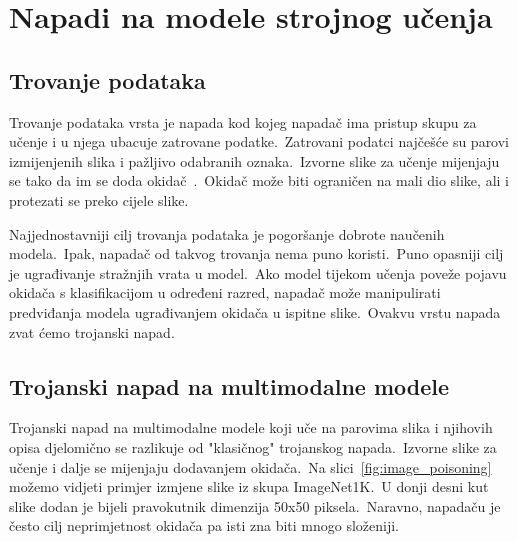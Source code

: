 \documentclass[times, utf8, seminar, numeric]{fer}
\begin{document}
\chapter{Napadi na modele strojnog učenja}

\section{Trovanje podataka}

Trovanje podataka vrsta je napada kod kojeg napadač ima pristup skupu za učenje i u njega ubacuje zatrovane podatke.\
Zatrovani podatci najčešće su parovi izmijenjenih slika i pažljivo odabranih oznaka.\ 
Izvorne slike za učenje mijenjaju se tako da im se doda okidač~\cite{chen2017targeted}.\ 
Okidač može biti ograničen na mali dio slike, ali i protezati se preko cijele slike.\
  
Najjednostavniji cilj trovanja podataka je pogoršanje dobrote naučenih modela.\ Ipak, napadač od takvog trovanja nema puno koristi.\
Puno opasniji cilj je ugrađivanje stražnjih vrata u model.\ Ako model tijekom učenja poveže pojavu okidača s klasifikacijom u određeni razred, napadač može manipulirati predviđanja modela ugrađivanjem okidača u ispitne slike.\
Ovakvu vrstu napada zvat ćemo trojanski napad.\

\section{Trojanski napad na multimodalne modele}

Trojanski napad na multimodalne modele koji uče na parovima slika i njihovih opisa djelomično se razlikuje od "klasičnog" trojanskog napada.\ 
Izvorne slike za učenje i dalje se mijenjaju dodavanjem okidača.\ Na slici~\ref{fig:image_poisoning} možemo vidjeti primjer izmjene slike iz skupa ImageNet1K.\ 
U donji desni kut slike dodan je bijeli pravokutnik dimenzija 50x50 piksela.\ Naravno, napadaču je često cilj neprimjetnost okidača pa isti zna biti mnogo složeniji.\

\pagebreak
\end{document}
